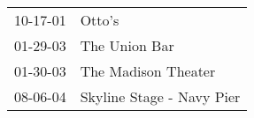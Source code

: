 \begin{supertabular}{p{0.25\columnwidth}p{0.75\columnwidth}}
 10-17-01 &                     Otto's \\
 01-29-03 &              The Union Bar \\
 01-30-03 &        The Madison Theater \\
 08-06-04 &  Skyline Stage - Navy Pier \\
\end{supertabular}

